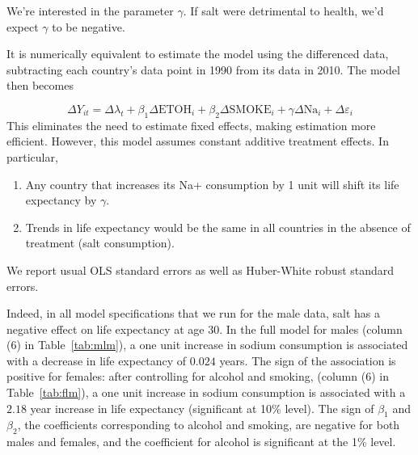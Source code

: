 \documentclass[11pt]{article}\usepackage[]{graphicx}\usepackage[]{color}
\newcommand{\eps}{\varepsilon}
\begin{document}
We're interested in the parameter $\gamma$.
If salt were detrimental to health, we'd expect $\gamma$ to be negative.

It is numerically equivalent to estimate the model using the differenced data, subtracting each country's data point in 1990 from its data in 2010.
The model then becomes

$$\Delta Y_{it} =  \Delta \lambda_t + \beta_1\Delta \text{ETOH}_{i} + \beta_2\Delta \text{SMOKE}_{i} + \gamma\Delta \text{Na}_{i} + \Delta \eps_{i}$$
This eliminates the need to estimate fixed effects, making estimation more efficient.
However, this model assumes constant additive treatment effects.
In particular,
\begin{enumerate}
\item Any country that increases its Na+ consumption by 1 unit will shift its life expectancy by $\gamma$.
\item Trends in life expectancy would be the same in all countries in the absence of treatment (salt consumption).
\end{enumerate}

We report usual OLS standard errors as well as Huber-White robust standard errors.


Indeed, in all model specifications that we run for the male data, salt has a negative effect on life expectancy at age 30.
In the full model for males (column (6) in Table~\ref{tab:mlm}), a one unit increase in sodium consumption is associated with a decrease in life expectancy of $0.024$ years.
The sign of the association is positive for females:
after controlling for alcohol and smoking, (column (6) in Table~\ref{tab:flm}), a one unit increase in sodium consumption is associated with a $2.18$ year increase in life expectancy (significant at 10\% level).
The sign of $\beta_1$ and $\beta_2$, the coefficients corresponding to alcohol and smoking, are negative for both males and females, and the coefficient for alcohol is significant at the 1\% level.
\end{document}
